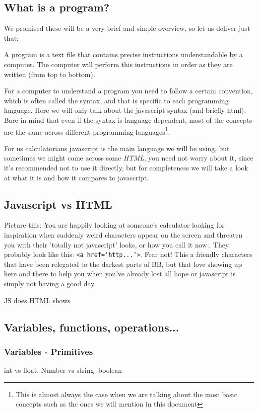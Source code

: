 \subsection{What is a program?} 
\label{sub:program}
We promised these will be a very brief and simple overview, so let us deliver just that:

A program is a text file that contains precise instructions understandable by a computer. The computer will perform this instructions in order as they are written (from top to bottom). 

For a computer to understand a program you need to follow a certain convention, which is often called the syntax, and that is specific to each programming language. Here we will only talk about the javascript syntax (and briefly html). Bare in mind that even if the syntax is language-dependent, most of the concepts are the same across different programming languages\footnote{This is almost always the case when we are talking about the most basic concepts such as the ones we will mention in this document}.

For us calculatorians javascript is the main language we will be using, but sometimes we might come across some \textit{HTML}, you need not worry about it, since it's recommended not to use it directly, but for completeness we will take a look at what it is and how it compares to javascript.
\subsection{Javascript vs HTML}
\label{sub:jsHtml}
Picture this: You are happily looking at someone's calculator looking for inspiration when suddenly weird characters appear on the screen and threaten you with their 'totally not javascript' looks, or how you call it now:. They probably look like this: \texttt{<a href='http...'>}. Fear not! This a friendly characters that have been relegated to the darkest parts of BB, but that love showing up here and there to help you when you've already lost all hope or javascript is simply not having a good day. 


JS does
HTML shows

\subsection{Variables, functions, operations...}
\label{sub:types}
    \subsubsection{Variables - Primitives}
    \label{subsub:primitives}
int vs float. Number vs string. boolean
